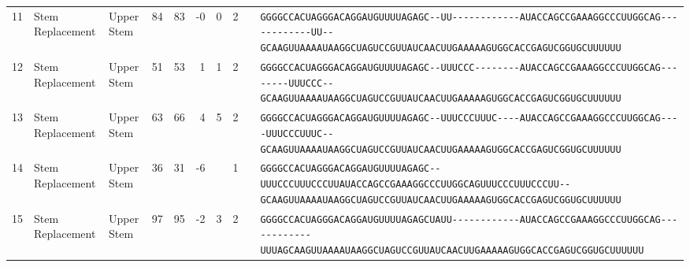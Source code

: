 \begin{tabular}{rllrrrrrcl}
 11 & Stem Replacement & Upper Stem & 84 & 83 & -0 & 0 & 2 &  &
 \color{ucsfdarkgrey}\verb|GGGGCCACUAGGGACAGGAU|\color{ucsforange}\verb|GUUUUA|\color{ucsfblue}\verb|GAGC--UU------------|\color{ucsfpurple}\verb|AUACCAGCCGAAAGGCCCUUGGCAG|\color{ucsfblue}\verb|------------UU--GCAAGU|\color{ucsforange}\verb|UAAAAUAA|\color{ucsfnavy}\verb|GGCUAGUCC|\color{ucsforange}\verb|GUUAUCA|\color{ucsfteal}\verb|ACUUGAAAAAGUG|\color{ucsforange}\verb|GCACCGAGUCGGUGCUUUUUU| \\

 12 & Stem Replacement & Upper Stem & 51 & 53 & 1 & 1 & 2 &  &
 \color{ucsfdarkgrey}\verb|GGGGCCACUAGGGACAGGAU|\color{ucsforange}\verb|GUUUUA|\color{ucsfblue}\verb|GAGC--UUUCCC--------|\color{ucsfpurple}\verb|AUACCAGCCGAAAGGCCCUUGGCAG|\color{ucsfblue}\verb|--------UUUCCC--GCAAGU|\color{ucsforange}\verb|UAAAAUAA|\color{ucsfnavy}\verb|GGCUAGUCC|\color{ucsforange}\verb|GUUAUCA|\color{ucsfteal}\verb|ACUUGAAAAAGUG|\color{ucsforange}\verb|GCACCGAGUCGGUGCUUUUUU| \\

 13 & Stem Replacement & Upper Stem & 63 & 66 & 4 & 5 & 2 &  &
 \color{ucsfdarkgrey}\verb|GGGGCCACUAGGGACAGGAU|\color{ucsforange}\verb|GUUUUA|\color{ucsfblue}\verb|GAGC--UUUCCCUUUC----|\color{ucsfpurple}\verb|AUACCAGCCGAAAGGCCCUUGGCAG|\color{ucsfblue}\verb|----UUUCCCUUUC--GCAAGU|\color{ucsforange}\verb|UAAAAUAA|\color{ucsfnavy}\verb|GGCUAGUCC|\color{ucsforange}\verb|GUUAUCA|\color{ucsfteal}\verb|ACUUGAAAAAGUG|\color{ucsforange}\verb|GCACCGAGUCGGUGCUUUUUU| \\

 14 & Stem Replacement & Upper Stem & 36 & 31 & -6 &  & 1 &  &
 \color{ucsfdarkgrey}\verb|GGGGCCACUAGGGACAGGAU|\color{ucsforange}\verb|GUUUUA|\color{ucsfblue}\verb|GAGC--UUUCCCUUUCCCUU|\color{ucsfpurple}\verb|AUACCAGCCGAAAGGCCCUUGGCAG|\color{ucsfblue}\verb|UUUCCCUUUCCCUU--GCAAGU|\color{ucsforange}\verb|UAAAAUAA|\color{ucsfnavy}\verb|GGCUAGUCC|\color{ucsforange}\verb|GUUAUCA|\color{ucsfteal}\verb|ACUUGAAAAAGUG|\color{ucsforange}\verb|GCACCGAGUCGGUGCUUUUUU| \\

 15 & Stem Replacement & Upper Stem & 97 & 95 & -2 & 3 & 2 &  &
 \color{ucsfdarkgrey}\verb|GGGGCCACUAGGGACAGGAU|\color{ucsforange}\verb|GUUUUA|\color{ucsfblue}\verb|GAGCUAUU------------|\color{ucsfpurple}\verb|AUACCAGCCGAAAGGCCCUUGGCAG|\color{ucsfblue}\verb|------------UUUAGCAAGU|\color{ucsforange}\verb|UAAAAUAA|\color{ucsfnavy}\verb|GGCUAGUCC|\color{ucsforange}\verb|GUUAUCA|\color{ucsfteal}\verb|ACUUGAAAAAGUG|\color{ucsforange}\verb|GCACCGAGUCGGUGCUUUUUU| \\


\end{tabular}
